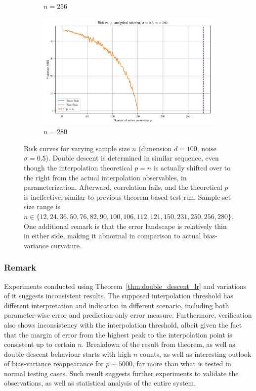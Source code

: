 \documentclass{article}
\begin{document}
\begin{figure}[htb]
\begin{subfigure}[b]{\imgwidth}
    \caption{$n=256$}\label{fig:2o}
  \end{subfigure}%
  \hfill
  \begin{subfigure}[b]{\imgwidth}
    \includegraphics[width=\linewidth]{img2/risk_curve_n280.png}
    \caption{$n=280$}\label{fig:2p}
  \end{subfigure}

  \caption{Risk curves for varying sample size $n$ (dimension $d=100$, noise $\sigma=0.5$). Double descent is determined in similar sequence, even though the interpolation theoretical $p=n$ is actually shifted over to the right from the actual interpolation observables, in parameterization. Afterward, correlation fails, and the theoretical $p$ is ineffective, similar to previous theorem-based test run. Sample set size range is $n\in\{12,24,36,50,76,82,90,100,106,112,121,150,231,250,256,280\}$. One additional remark is that the error landscape is relatively thin in either side, making it abnormal in comparison to actual bias-variance curvature.}
  \label{fig:risk_all_grid}
\end{figure}

\subsubsection{Remark}

Experiments conducted using Theorem~\ref{thm:double_descent_lr} and variations of it suggests inconsistent results. The supposed interpolation threshold has different interpretation and indication in different scenario, including both parameter-wise error and prediction-only error measure. Furthermore, verification also shows inconsistency with the interpolation threshold, albeit given the fact that the margin of error from the highest peak to the interpolation point is consistent up to certain $n$. Breakdown of the result from theorem, as well as double descent behaviour starts with high $n$ counts, as well as interesting outlook of bias-variance reappearance for $p\sim 5000$, far more than what is tested in normal testing cases. Such result suggests further experiments to validate the observations, as well as statistical analysis of the entire system. 
\end{document}

